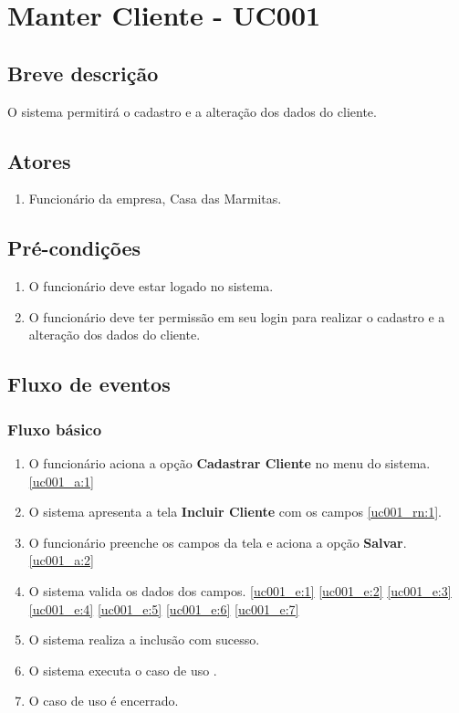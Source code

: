 \chapter{Manter Cliente - UC001} \label{uc001}
 
\section{Breve descrição}
 
O sistema permitirá o cadastro e a alteração dos dados do cliente.

\section{Atores}

\begin{enumerate}
	\item Funcionário da empresa, Casa das Marmitas.
\end{enumerate}

\section{Pré-condições}

\begin{enumerate}
	\item O funcionário deve estar logado no sistema.
	\item O funcionário deve ter permissão em seu login para realizar o cadastro e a alteração dos dados do cliente.
\end{enumerate}

\section{Fluxo de eventos}

\subsection{Fluxo básico}

\begin{enumerate}[label=P\arabic*]
	\item O funcionário aciona a opção \textbf{Cadastrar Cliente} no menu do sistema. \ref{uc001_a:1}
	\item O sistema apresenta a tela \textbf{Incluir Cliente} com os campos \ref{uc001_rn:1}. \label{uc001_p:2}
	\item O funcionário preenche os campos da tela e aciona a opção \textbf{Salvar}. \label{uc001_p:3} \ref{uc001_a:2}
	\item O sistema valida os dados dos campos. \ref{uc001_e:1} \ref{uc001_e:2} \ref{uc001_e:3} \ref{uc001_e:4} \ref{uc001_e:5} \ref{uc001_e:6} \ref{uc001_e:7}
	\item O sistema realiza a inclusão com sucesso.
	\item O sistema executa o caso de uso .
	\item O caso de uso é encerrado.	
\end{enumerate}

